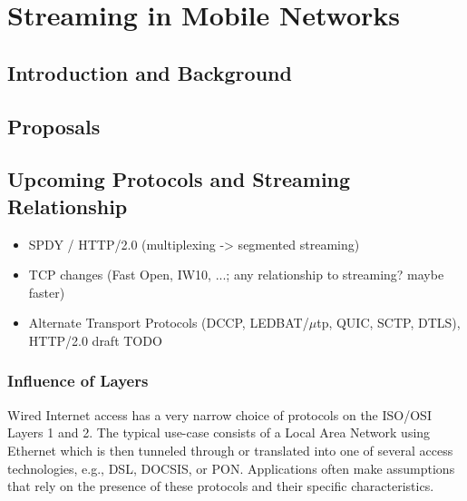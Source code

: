 \chapter{Streaming in Mobile Networks}


\section{Introduction and Background}


\section{Proposals}


\section{Upcoming Protocols and Streaming Relationship}

\begin{itemize}
\item SPDY / HTTP/2.0 (multiplexing -> segmented streaming)
\item TCP changes (Fast Open, IW10, ...; any relationship to streaming? maybe faster)
\item Alternate Transport Protocols (DCCP\cite{rfc4340}, LEDBAT\cite{rfc6817}/$\mu$tp\cite{bt2010utp}, QUIC, SCTP, DTLS), HTTP/2.0 draft TODO
\end{itemize}


\subsection{Influence of Layers}

Wired Internet access has a very narrow choice of protocols on the ISO/OSI Layers 1 and 2. The typical use-case consists of a Local Area Network using Ethernet which is then tunneled through or translated into one of several access technologies, e.g., DSL, DOCSIS, or PON. Applications often make assumptions that rely on the presence of these protocols and their specific characteristics.

